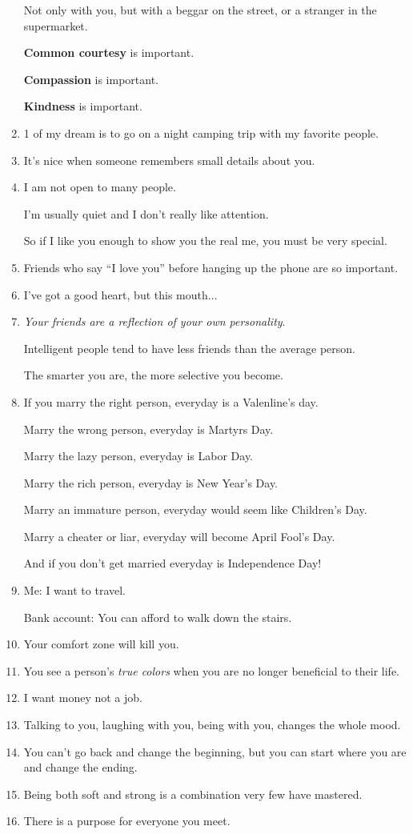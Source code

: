 \documentclass{article}
\begin{document}
\begin{enumerate}
	Not only with you, but with a beggar on the street, or a stranger in the supermarket.
	
	\textbf{Common courtesy} is important.
	
	\textbf{Compassion} is important.
	
	\textbf{Kindness} is important.
	\item 1 of my dream is to go on a night camping trip with my favorite people.
	\item It's nice when someone remembers small details about you.
	\item I am not open to many people.
	
	I'm usually quiet and I don't really like attention.
	
	So if I like you enough to show you the real me, you must be very special.
	\item Friends who say ``I love you'' before hanging up the phone are so important.
	\item I've got a good heart, but this mouth$\ldots$
	\item \textit{Your friends are a reflection of your own personality}.
	
	Intelligent people tend to have less friends than the average person.
	
	The smarter you are, the more selective you become.
	\item If you marry the right person, everyday is a Valenline's day.
	
	Marry the wrong person, everyday is Martyrs Day.
	
	Marry the lazy person, everyday is Labor Day.
	
	Marry the rich person, everyday is New Year's Day.
	
	Marry an immature person, everyday would seem like Children's Day.
	
	Marry a cheater or liar, everyday will become April Fool's Day.
	
	And if you don't get married everyday is Independence Day!
	\item Me: I want to travel.
	
	Bank account: You can afford to walk down the stairs.
	\item Your comfort zone will kill you.
	\item You see a person's \textit{true colors} when you are no longer beneficial to their life.
	\item I want money not a job.
	\item Talking to you, laughing with you, being with you, changes the whole mood.
	\item You can't go back and change the beginning, but you can start where you are and change the ending.
	\item Being both soft and strong is a combination very few have mastered.
	\item There is a purpose for everyone you meet.
	

\end{enumerate}
\end{document}
